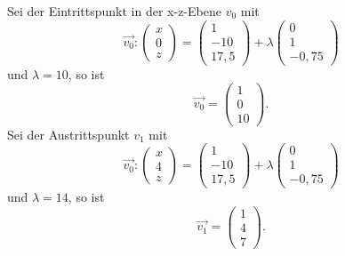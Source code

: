 Sei der Eintrittspunkt in der x-z-Ebene $\displaystyle v_{0}$ mit
\begin{equation*}
	\overrightarrow{v_{0}} :\begin{pmatrix}
		x\\
		0\\
		z
	\end{pmatrix} =\begin{pmatrix}
		1\\
		-10\\
		17,5
	\end{pmatrix} +\lambda \begin{pmatrix}
		0\\
		1\\
		-0,75
	\end{pmatrix}
\end{equation*}
und $\displaystyle \lambda =10$, so ist
\begin{equation*}
	\overrightarrow{v_{0}} =\begin{pmatrix}
		1\\
		0\\
		10
	\end{pmatrix}\text{.}
\end{equation*}
Sei der Austrittspunkt $\displaystyle v_{1}$ mit
\begin{equation*}
	\overrightarrow{v_{0}} :\begin{pmatrix}
		x\\
		4\\
		z
	\end{pmatrix} =\begin{pmatrix}
		1\\
		-10\\
		17,5
	\end{pmatrix} +\lambda \begin{pmatrix}
		0\\
		1\\
		-0,75
	\end{pmatrix}
\end{equation*}
und $\displaystyle \lambda =14$, so ist
\begin{equation*}
	\overrightarrow{v_{1}} =\begin{pmatrix}
		1\\
		4\\
		7
	\end{pmatrix}\text{.}
\end{equation*}


